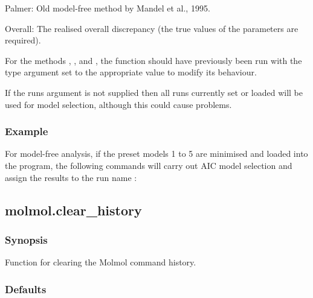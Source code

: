  Palmer:  Old model-free method by Mandel et al., 1995. 
  

 Overall:  The realised overall discrepancy (the true values of the parameters are required). 
  

 For the methods , , and , the function  should have previously been run with the type argument set to the appropriate value to modify its behaviour. 
  

 If the runs argument is not supplied then all runs currently set or loaded will be used for model selection, although this could cause problems. 
  

  
 \subsubsection{Example} 

 For model-free analysis, if the preset models 1 to 5 are minimised and loaded into the program, the following commands will carry out AIC model selection and assign the results to the run name : 
  





  

 \newpage 

 \subsection{molmol.clear\_history} 

  
 \subsubsection{Synopsis} 

 Function for clearing the Molmol command history. 
  

  
 \subsubsection{Defaults} 

